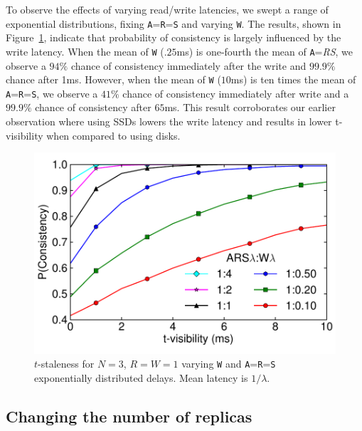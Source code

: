 \documentclass{vldb}
\begin{document}
To observe the effects of varying read/write latencies, we swept a range
of exponential distributions, fixing \texttt{A}=\texttt{R}=\texttt{S}
and varying \texttt{W}.  The results, shown in
Figure~\ref{fig:varydelay}, indicate that probability of consistency is
largely influenced by the write latency. When the mean of \texttt{W} 
($.25$ms) is one-fourth the mean of \texttt{A}=\textit{R}\textit{S}, we 
observe a $94\%$ chance of consistency immediately after the write and 
$99.9\%$ chance after 1ms.  However, when the mean of \texttt{W} ($10$ms) is
ten times the mean of \texttt{A}=\texttt{R}=\texttt{S}, we observe a
$41\%$ chance of consistency immediately after write and a $99.9\%$
chance of consistency after $65$ms. This result corroborates our earlier 
observation where using SSDs lowers the write latency and results in
lower t-visibility when compared to using disks.  



\begin{figure}
\centering
\includegraphics[width=.85\columnwidth]{figs/rwratio.pdf}
\caption{$t$-staleness for $N$$=$$3$, $R$$=$$W$$=$$1$ varying \texttt{W} and \texttt{A}=\texttt{R}=\texttt{S} exponentially distributed delays.  Mean latency is $1/\lambda$.}
\label{fig:varydelay}
\end{figure}

\subsection{Changing the number of replicas}
\end{document}
